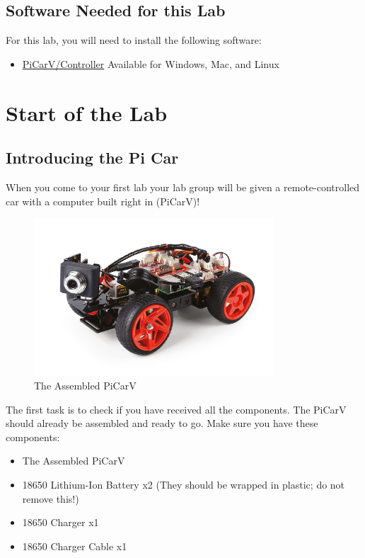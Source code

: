 \documentclass[11pt]{report}
\begin{document}
    \section{Software Needed for this Lab}
    For this lab, you will need to install the following software:
    \begin{itemize}
        \item 
        \href{https://github.com/PiCarV/Controller/releases/latest}{PiCarV/Controller} Available for Windows, Mac, and Linux     
    \end{itemize}


    \clearpage

    \chapter{Start of the Lab}

    \section{Introducing the Pi Car}
    When you come to your first lab your lab group will be given a remote-controlled car with a computer built right in (PiCarV)! 

    \begin{figure}[h]
        \centering
        \includegraphics[width=0.8\textwidth]{picarv.jpg}
        \caption{The Assembled PiCarV}
        \label{fig:The Assembled PiCarV}
    \end{figure}

    The first task is to check if you have received all the components. The PiCarV should already be assembled and ready to go. Make sure you have these components:

    \begin{itemize}
        \item The Assembled PiCarV
        \item 18650 Lithium-Ion Battery x2 (They should be wrapped in plastic; do not remove this!)
        \item 18650 Charger x1
        \item 18650 Charger Cable x1
    \end{itemize}
\end{document}
